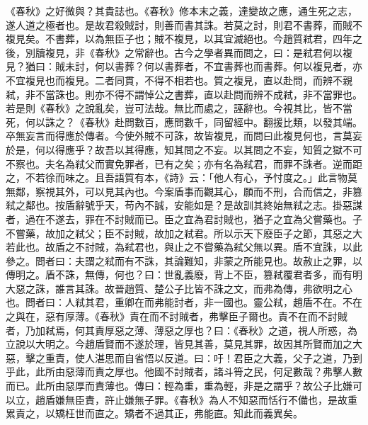《春秋》之好微與？其貴誌也。《春秋》修本末之義，達變故之應，通生死之志，遂人道之極者也。是故君殺賊討，則善而書其誅。若莫之討，則君不書葬，而賊不複見矣。不書葬，以為無臣子也；賊不複見，以其宜滅絕也。今趙質弒君，四年之後，別牘複見，非《春秋》之常辭也。古今之學者異而問之，曰：是弒君何以複見？猶曰：賊未討，何以書葬？何以書葬者，不宜書葬也而書葬。何以複見者，亦不宜複見也而複見。二者同貫，不得不相若也。質之複見，直以赴問，而辨不親弒，非不當誅也。則亦不得不謂悼公之書葬，直以赴問而辨不成弒，非不當罪也。若是則《春秋》之說亂矣，豈可法哉。無比而處之，誣辭也。今視其比，皆不當死，何以誅之？《春秋》赴問數百，應問數千，同留經中。翻援比類，以發其端。卒無妄言而得應於傳者。今使外賊不可誅，故皆複見，而問曰此複見何也，言莫妄於是，何以得應乎？故吾以其得應，知其問之不妄。以其問之不妄，知質之獄不可不察也。夫名為弒父而實免罪者，已有之矣；亦有名為弒君，而罪不誅者。逆而距之，不若徐而味之。且吾語質有本，《詩》云：「他人有心，予忖度之。」此言物莫無鄰，察視其外，可以見其內也。今案盾事而觀其心，願而不刑，合而信之，非篡弒之鄰也。按盾辭號乎天，苟內不誠，安能如是？是故訓其終始無弒之志。掛惡謀者，過在不遂去，罪在不討賊而已。臣之宜為君討賊也，猶子之宜為父嘗藥也。子不嘗藥，故加之弒父；臣不討賊，故加之弒君。所以示天下廢臣子之節，其惡之大若此也。故盾之不討賊，為弒君也，與止之不嘗藥為弒父無以異。盾不宜誅，以此參之。問者曰：夫謂之弒而有不誅，其論難知，非蒙之所能見也。故赦止之罪，以傳明之。盾不誅，無傳，何也？曰：世亂義廢，背上不臣，篡弒覆君者多，而有明大惡之誅，誰言其誅。故晉趙質、楚公子比皆不誅之文，而弗為傳，弗欲明之心也。問者曰：人弒其君，重卿在而弗能討者，非一國也。靈公弒，趙盾不在。不在之與在，惡有厚薄。《春秋》責在而不討賊者，弗擊臣子爾也。責不在而不討賊者，乃加弒焉，何其責厚惡之薄、薄惡之厚也？曰：《春秋》之道，視人所惑，為立說以大明之。今趙盾賢而不遂於理，皆見其善，莫見其罪，故因其所賢而加之大惡，擊之重責，使人湛思而自省悟以反道。曰：吁！君臣之大義，父子之道，乃到乎此，此所由惡薄而責之厚也。他國不討賊者，諸斗筲之民，何足數哉？弗擊人數而已。此所由惡厚而責薄也。傳曰：輕為重，重為輕，非是之謂乎？故公子比嫌可以立，趙盾嫌無臣責，許止嫌無子罪。《春秋》為人不知惡而恬行不備也，是故重累責之，以矯枉世而直之。矯者不過其正，弗能直。知此而義異矣。


